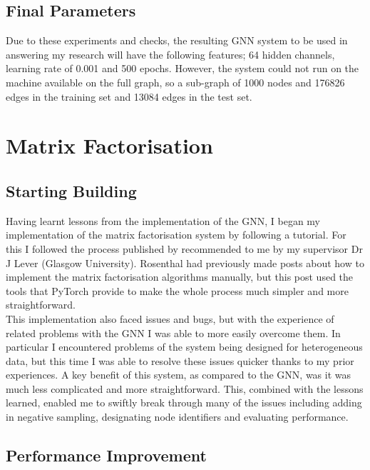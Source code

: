 \documentclass{l4proj}
\begin{document}
\subsection{Final Parameters}

Due to these experiments and checks, the resulting GNN system to be used in answering my research will have the following features; 64 hidden channels, learning rate of 0.001 and 500 epochs. However, the system could not run on the machine available on the full graph, so a sub-graph of 1000 nodes and 176826 edges in the training set and 13084 edges in the test set.\\

\section{Matrix Factorisation}

\subsection{Starting Building}

Having learnt lessons from the implementation of the GNN, I began my implementation of the matrix factorisation system by following a tutorial. For this I followed the process published by \cite{mf_tutorial} recommended to me by my supervisor Dr J Lever (Glasgow University). Rosenthal had previously made posts about how to implement the matrix factorisation algorithms manually, but this post used the tools that PyTorch provide to make the whole process much simpler and more straightforward. \\

This implementation also faced issues and bugs, but with the experience of related problems with the GNN I was able to more easily overcome them. In particular I encountered problems of the system being designed for heterogeneous data, but this time I was able to resolve these issues quicker thanks to my prior experiences. A key benefit of this system, as compared to the GNN, was it was much less complicated and more straightforward. This, combined with the lessons learned, enabled me to swiftly break through many of the issues including adding in negative sampling, designating node identifiers and evaluating performance. \\

\subsection{Performance Improvement}
\end{document}
